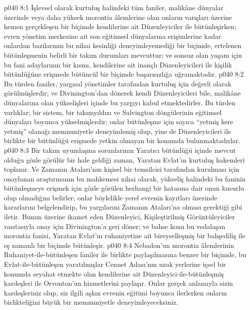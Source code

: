 \vs p040 8:1 İşlevsel olarak kurtuluş halindeki tüm faniler, malikâne dünyalar üzerinde veya daha yüksek morontia âlemlerine olan onların varışları üzerine hemen gerçekleşen bir biçimde kendilerine ait Düzenleyiciler ile bütünleşirken; evren yönetim merkezine ait son eğitimsel dünyalarına erişimlerine kadar onlardan bazılarının bu nihai kesinliği deneyimleyemediği bir biçimde, ertelenen bütünleşmenin belirli bir takım durumları mevcuttur; ve sonsuz olan yaşam için bu fani adaylarının bir kısmı, kendilerine ait inançlı Düzenleyicileri ile kişilik bütünlüğüne erişmede bütüncül bir biçimde başarısızlığa uğramaktadır.
\vs p040 8:2 Bu türden faniler, yargısal yönetimler tarafından kurtuluş için değerli olarak görülmüşlerdir; ve Divinington’dan dönerek kendi Düzenleyicileri bile, malikâne dünyalarına olan yükselişleri içinde bu yargıyı kabul etmektedirler. Bu türden varlıklar; bir sistem, bir takımyıldızı ve Salvington döngülerinin eğitimsel dünyaları boyunca yükselmişlerdir; onlar bütünleşme için sayıca “yetmiş kere yetmiş” olanağı memnuniyetle deneyimlemiş olup, yine de Düzenleyicileri ile birlikte bir bütünlüğü erişmede yetkin olmayan bir konumda bulunmaktadırlar.
\vs p040 8:3 Bir takım uyumlaşma sorunlarının Yaratıcı bütünlüğü içinde mevcut olduğu gözle görülür bir hale geldiği zaman, Yaratan Evlat’ın kurtuluş hakemleri toplanır. Ve Zamanın Ataları’nın kişisel bir temsilcisi tarafından kurulması için onaylanan araştırmanın bu mahkemesi nihai olarak, yükseliş halindeki bu faninin bütünleşmeye erişmek için gözle görülen herhangi bir hatasına dair onun kusurlu olup olmadığını belirler; onlar böylelikle yerel evrenin kayıtları üzerinde kararlarını belgelendirip, bu yargılarını Zamanın Ataları’na olması gerektiği gibi iletir. Bunun üzerine ikamet eden Düzenleyici, Kişileştirilmiş Görüntüleyiciler vasıtasıyla onay için Divinington’a geri döner; ve bahse konu bu vedalaşan morontia fanisi, Yaratan Evlat’ın ruhaniyetine ait bireyselleşmiş bir bahşediliş ile eş zamanlı bir biçimde bütünleşir.
\vs p040 8:4 Nebadon’un morontia âlemlerinin Ruhaniyet\hyp{}ile\hyp{}bütünleşen faniler ile birlikte paylaşılmasına benzer bir biçimde, bu Evlat\hyp{}ile\hyp{}bütünleşen yaratılmışlar Cennet Adası’nın uzak yerlerine içsel bir konumda seyahat etmekte olan kendilerine ait Düzenleyici\hyp{}ile\hyp{}bütünleşmiş kardeşleri ile Orvonton’un hizmetlerini paylaşır. Onlar gerçek anlamıyla sizin kardeşleriniz olup, siz ilgili aşkın evrenin eğitimi boyunca ilerlerken onların birlikteliğini büyük bir memnuniyetle deneyimleyeceksiniz.
